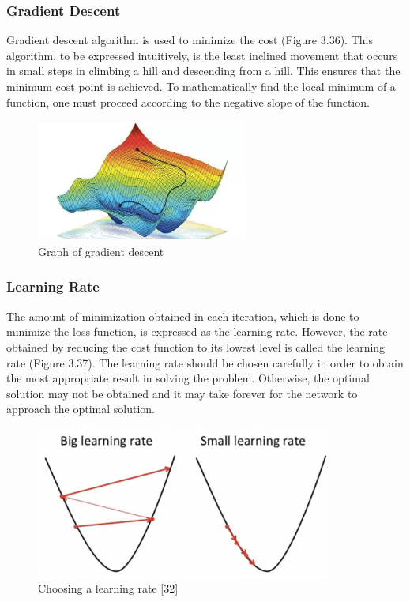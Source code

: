 \documentclass[12pt,twoside,a4]{mwbk}
\begin{document}
\subsubsection{Gradient Descent}
Gradient descent algorithm is used to minimize the cost (Figure 3.36). This algorithm, to be expressed intuitively, is the least inclined movement that occurs in small steps in climbing a hill and descending from a hill. This ensures that the minimum cost point is achieved. To mathematically find the local minimum of a function, one must proceed according to the negative slope of the function.
\begin{figure}[h]
    \centering
    \includegraphics[width=7.0cm, height=4.0cm]{GDescent.png}
    \caption{Graph of gradient descent}
\end{figure}

\subsubsection{Learning Rate}
The amount of minimization obtained in each iteration, which is done to minimize the loss function, is expressed as the learning rate. However, the rate obtained by reducing the cost function to its lowest level is called the learning rate (Figure 3.37). The learning rate should be chosen carefully in order to obtain the most appropriate result in solving the problem. Otherwise, the optimal solution may not be obtained and it may take forever for the network to approach the optimal solution.

\begin{figure}[h]
    \centering
    \includegraphics[width=9.7cm, height=5.0cm]{Learning_rate.png}
    \caption{Choosing a learning rate [32]}
\end{figure}
\end{document}
